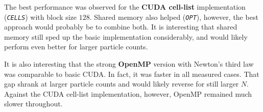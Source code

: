 \documentclass[11pt]{article}
\begin{document}
The best performance was observed for the \textbf{CUDA cell-list} implementation (\textit{\texttt{CELLS}}) with block size $128$. Shared memory also helped (\textit{\texttt{OPT}}), however, the best approach would probably be to combine both. It is interesting that shared memory still sped up the basic implementation considerably, and would likely perform even better for larger particle counts.

It is also interesting that the strong \textbf{OpenMP} version with Newton's third law was comparable to basic CUDA. In fact, it was faster in all measured cases. That gap shrank at larger particle counts and would likely reverse for still larger $N$. Against the CUDA cell-list implementation, however, OpenMP remained much slower throughout.
\end{document}
